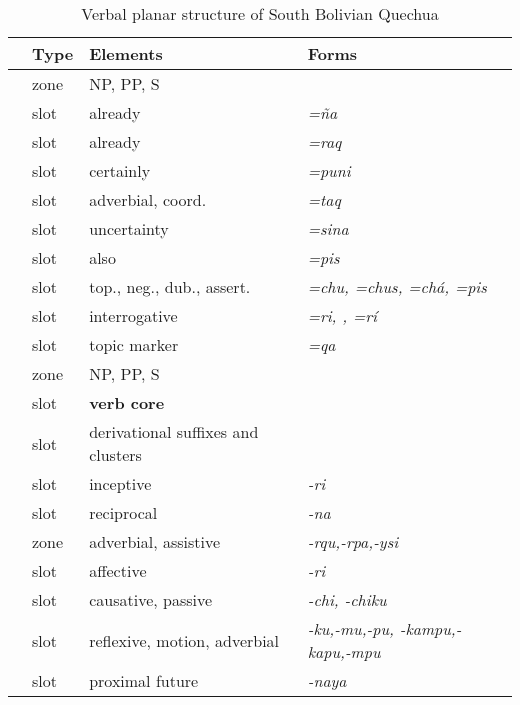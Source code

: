 \documentclass[output=paper]{langscibook}
\begin{document}
\begin{longtable}{Slll}
\caption{Verbal planar structure of South Bolivian Quechua} 
\label{sbq:tab:verbalplanar} 
\endfirsthead 
\endhead
\lsptoprule
	    & Type  & Elements  & Forms \\ \midrule
\label{vpos:XP1}     & zone  & NP, PP, S & \textit{} \\
\label{vpos:ña1}     & slot  & already   & \textit{=ña}                  \\
\label{vpos:raq1}     & slot  & already   & \textit{=raq}            \\
\label{vpos:puni1}   & slot  & certainly     & \textit{=puni} \\
\label{vpos:taq1} & slot & adverbial, coord.         & \textit{=taq}   \\
\label{vpos:sina1}    & slot  & uncertainty   & \textit{=sina}     \\
\label{vpos:pis1}    & slot  & also   & \textit{=pis}     \\
\label{vpos:clitics} & slot & top., neg., dub., assert. & \textit{=chu, =chus, =chá, =pis}   \\
\label{vpos:ri} & slot & interrogative & \textit{=ri, , =rí}   \\
\label{vpos:qa} & slot & topic marker  & \textit{=qa}   \\
\label{vpos:XP2}     & zone          & NP, PP, S               & \textit{}               \\
\label{vpos:vcore}       & slot  &  \textbf{verb core}   & \textit{}      \\
\label{vpos:derivsuf1}   & slot  & derivational suffixes and clusters &   \\
\label{vpos:ri.suffix}   & slot  & inceptive     & \textit{-ri}               \\
\label{vpos:recipsuf} & slot     & reciprocal        & \textit{-na}              \\
\label{vpos:asssuf}  & zone  & adverbial, assistive  & \textit{-rqu,-rpa,-ysi} \\
\label{vpos:affect}  & slot  & affective     & \textit{-ri}      \\
\label{vpos:chi}     & slot  & causative, passive     & \textit{-chi, -chiku}     \\
\label{vpos:advsuf} & slot  & reflexive, motion, adverbial  & 
\textit{-ku,-mu,-pu, -kampu,-kapu,-mpu}    \\
\label{vpos:naya} & slot  & proximal future  & \textit{-naya}    \\

\end{longtable}
\end{document}
